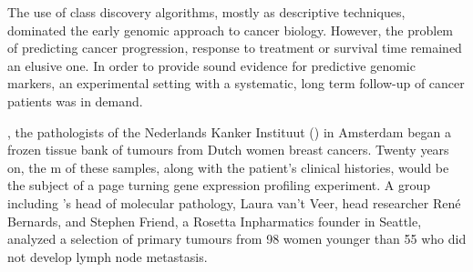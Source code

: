 The use of class discovery algorithms, mostly as descriptive techniques,
dominated the early genomic approach to cancer
biology.\cite{matros_genomic_2004,eschrich_dna_2004} However, the problem of
predicting cancer progression, response to treatment or survival time remained
an elusive one.  In order to provide sound evidence for predictive genomic
markers, an experimental setting with a systematic, long term follow-up of
cancer patients was in demand.

\medskip





, the pathologists of the Nederlands Kanker
Instituut () in Amsterdam began a frozen tissue bank of tumours
from Dutch women breast cancers.  Twenty years on, the m of these
samples, along with the patient's clinical histories, would be the subject of a
page turning gene expression profiling experiment.  A group including
's head of molecular pathology, Laura van't Veer, head researcher
René Bernards, and Stephen Friend, a Rosetta Inpharmatics founder in Seattle,
analyzed a selection of primary tumours from 98 women younger than 55 who did
not develop lymph node metastasis.\cite{vant_veer_gene_2002}

